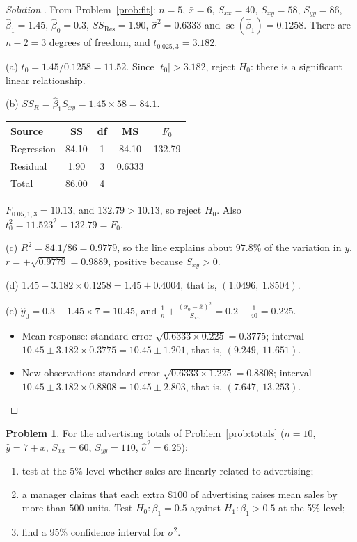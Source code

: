\documentclass[11pt,a4paper]{article}
\numberwithin{equation}{section}
\theoremstyle{definition}
\newtheorem{problemx}{Problem}[subsection]
\newenvironment{problem}{\begin{problemx}}{\end{problemx}}
\newenvironment{solution}
  {\renewcommand{\qedsymbol}{}\begin{proof}[\textit{Solution}.]}
  {\end{proof}}
\begin{document}
\begin{solution}
From Problem~\ref{prob:fit}: $n = 5$, $\bar x = 6$, $S_{xx} = 40$, $S_{xy} = 58$,
$S_{yy} = 86$, $\hat\beta_1 = 1.45$, $\hat\beta_0 = 0.3$, $SS_{\mathrm{Res}} = 1.90$,
$\hat\sigma^2 = 0.6333$ and $\operatorname{se}(\hat\beta_1) = 0.1258$. There are $n - 2 = 3$
degrees of freedom, and $t_{0.025,3} = 3.182$.

(a) $t_0 = 1.45/0.1258 = 11.52$. Since $|t_0| > 3.182$, reject $H_0$: there is a significant
linear relationship.

(b) $SS_R = \hat\beta_1 S_{xy} = 1.45 \times 58 = 84.1$.
\begin{center}
\begin{tabular}{lcccc}
\hline
Source & SS & df & MS & $F_0$ \\
\hline
Regression & 84.10 & 1 & 84.10 & 132.79 \\
Residual & 1.90 & 3 & 0.6333 & \\
\hline
Total & 86.00 & 4 & & \\
\hline
\end{tabular}
\end{center}
$F_{0.05,1,3} = 10.13$, and $132.79 > 10.13$, so reject $H_0$. Also
$t_0^2 = 11.523^2 = 132.79 = F_0$.

(c) $R^2 = 84.1/86 = 0.9779$, so the line explains about $97.8\%$ of the variation in $y$.
$r = +\sqrt{0.9779} = 0.9889$, positive because $S_{xy} > 0$.

(d) $1.45 \pm 3.182 \times 0.1258 = 1.45 \pm 0.4004$, that is, $(1.0496,\ 1.8504)$.

(e) $\hat y_0 = 0.3 + 1.45 \times 7 = 10.45$, and
$\frac1n + \frac{(x_0 - \bar x)^2}{S_{xx}} = 0.2 + \frac{1}{40} = 0.225$.
\begin{itemize}
\item Mean response: standard error $\sqrt{0.6333 \times 0.225} = 0.3775$; interval
$10.45 \pm 3.182 \times 0.3775 = 10.45 \pm 1.201$, that is, $(9.249,\ 11.651)$.
\item New observation: standard error $\sqrt{0.6333 \times 1.225} = 0.8808$; interval
$10.45 \pm 3.182 \times 0.8808 = 10.45 \pm 2.803$, that is, $(7.647,\ 13.253)$.
\end{itemize}
\end{solution}

\begin{problem}
For the advertising totals of Problem~\ref{prob:totals} ($n = 10$, $\hat y = 7 + x$, $S_{xx} = 60$,
$S_{yy} = 110$, $\hat\sigma^2 = 6.25$):
\begin{enumerate}[label=(\alph*)]
\item test at the 5\% level whether sales are linearly related to advertising;
\item a manager claims that each extra $\$100$ of advertising raises mean sales by more than
$500$ units. Test $H_0\colon \beta_1 = 0.5$ against $H_1\colon \beta_1 > 0.5$ at the 5\% level;
\item find a 95\% confidence interval for $\sigma^2$.
\end{enumerate}
\end{problem}
\end{document}
